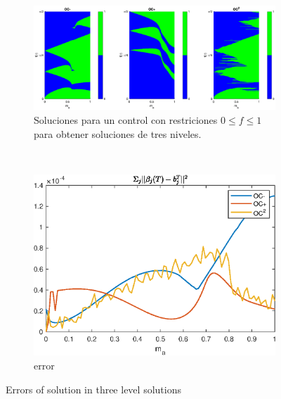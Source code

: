 \begin{enumerate}
    \begin{figure}
        \centering
        \begin{subfigure}[b]{\textwidth}
            \centering
            \includegraphics[scale=0.45]{img/EX01_surf_3LVL.eps}
            \caption{Soluciones para un control  con restriciones $0 \leq f\leq 1$ para obtener soluciones de tres niveles.}
        \end{subfigure} 
        \hfill \\
        \begin{subfigure}[b]{0.4\textwidth}
            \centering
            \includegraphics[scale=0.6]{img/EX01_3LVL.eps}
            \caption{error}
        \end{subfigure}
        \caption{Errors of solution in three level solutions}
        \label{ex3LVL}
    \end{figure}
    
    
    
      



\end{enumerate}
